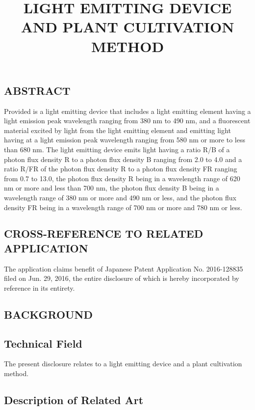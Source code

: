\documentclass[11pt,a4paper]{article}
\title{LIGHT EMITTING DEVICE AND PLANT CULTIVATION METHOD}
\begin{document}
\maketitle

\subsection{ABSTRACT}

Provided is a light emitting device that includes a light emitting element having a light emission peak wavelength ranging from 380 nm to 490 nm, and a fluorescent material excited by light from the light emitting element and emitting light having at a light emission peak wavelength ranging from 580 nm or more to less than 680 nm. The light emitting device emits light having a ratio R/B of a photon flux density R to a photon flux density B ranging from 2.0 to 4.0 and a ratio R/FR of the photon flux density R to a photon flux density FR ranging from 0.7 to 13.0, the photon flux density R being in a wavelength range of 620 nm or more and less than 700 nm, the photon flux density B being in a wavelength range of 380 nm or more and 490 nm or less, and the photon flux density FR being in a wavelength range of 700 nm or more and 780 nm or less.

\subsection{CROSS-REFERENCE TO RELATED APPLICATION}

The application claims benefit of Japanese Patent Application No. 2016-128835 filed on Jun. 29, 2016, the entire disclosure of which is hereby incorporated by reference in its entirety.

\subsection{BACKGROUND}

\subsection{Technical Field}

The present disclosure relates to a light emitting device and a plant cultivation method.

\subsection{Description of Related Art}
\end{document}
